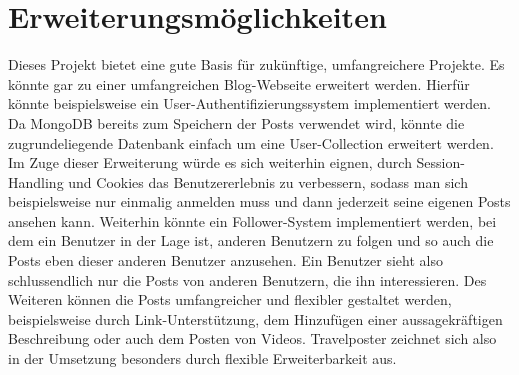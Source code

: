 \documentclass[12pt,a4paper]{report}
\begin{document}
\section{Erweiterungsmöglichkeiten}
Dieses Projekt bietet eine gute Basis für zukünftige, umfangreichere Projekte. Es könnte gar zu einer umfangreichen Blog-Webseite erweitert werden. Hierfür könnte beispielsweise ein User-Authentifizierungssystem implementiert werden. Da MongoDB bereits zum Speichern der Posts verwendet wird, könnte die zugrundeliegende Datenbank einfach um eine User-Collection erweitert werden. Im Zuge dieser Erweiterung würde es sich weiterhin eignen, durch Session-Handling und Cookies das Benutzererlebnis zu verbessern, sodass man sich beispielsweise nur einmalig anmelden muss und dann jederzeit seine eigenen Posts ansehen kann. Weiterhin könnte ein Follower-System implementiert werden, bei dem ein Benutzer in der Lage ist, anderen Benutzern zu folgen und so auch die Posts eben dieser anderen Benutzer anzusehen. Ein Benutzer sieht also schlussendlich nur die Posts von anderen Benutzern, die ihn interessieren.
Des Weiteren können die Posts umfangreicher und flexibler gestaltet werden, beispielsweise durch Link-Unterstützung, dem Hinzufügen einer aussagekräftigen Beschreibung oder auch dem Posten von Videos. Travelposter zeichnet sich also in der Umsetzung besonders durch flexible Erweiterbarkeit aus.


%
\end{document}
